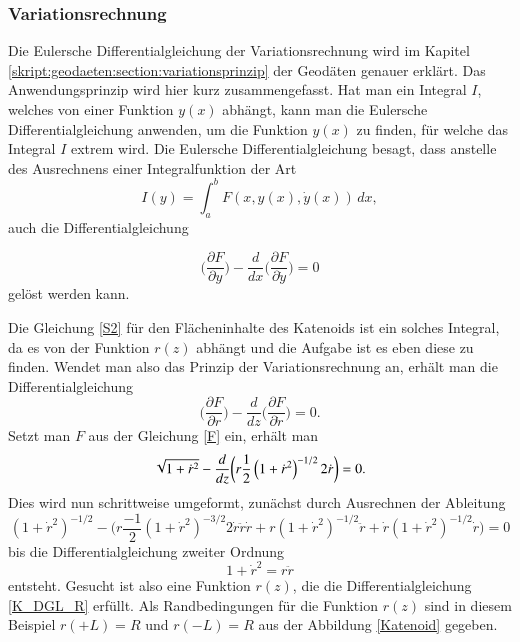 \begin{refsection}
\subsubsection{Variationsrechnung}
Die Eulersche Differentialgleichung der Variationsrechnung wird im Kapitel \ref{skript:geodaeten:section:variationsprinzip}  der Geodäten genauer erklärt.
Das Anwendungsprinzip wird hier kurz zusammengefasst. Hat man ein Integral $I$, welches von einer Funktion $y(x)$ abhängt, kann man die Eulersche Differentialgleichung anwenden, um die Funktion $y(x)$ zu finden, für welche das Integral $I$ extrem wird. Die Eulersche Differentialgleichung besagt, dass anstelle des Ausrechnens  einer Integralfunktion der Art \begin{equation} \label{E_DGL1}  
  I(y)= \int_a^b F(x,y(x),\dot y(x))\,dx ,       
\end{equation}
auch die Differentialgleichung  



\begin{equation} \label{E_DGL2}
\bigg(\frac{\partial F}{\partial y}\bigg)- \frac{d}{dx} \bigg(\frac{\partial F}{\partial \dot{y}}\bigg)=0         
\end{equation}
gelöst werden kann.

Die Gleichung \eqref{S2} für den Flächeninhalte des Katenoids ist ein solches Integral, da es von der Funktion $r(z)$ abhängt und die Aufgabe ist es eben diese zu finden. Wendet man also das Prinzip der Variationsrechnung an, erhält man die Differentialgleichung
\begin{equation} \label{K_DGL1}
\bigg(\frac{\partial F}{\partial r}\bigg)- \frac{d}{dz} \bigg(\frac{\partial F}{\partial \dot{r}}\bigg)=0 .
\end{equation}
Setzt man $F$ aus der Gleichung \eqref{F} ein, erhält man
\begin{equation} \label{K_DGL_H}
\sqrt{1+{\dot {r}}^2}-\frac{ d }{ dz } \bigg( r \frac{ 1 }{2  }\left( {1+{\dot {r}}^2}  \right)^{-1/2} 2 \dot {r}\bigg)=0 .
\\
\end{equation}
Dies wird nun schrittweise umgeformt, zunächst durch Ausrechnen der Ableitung
\begin{equation} \label{K_DGL_H2}
\left(1+{\dot {r}}^2  \right)^{-1/2}-\bigg(r \frac{ -1 }{2  } \left({1+{\dot {r}}^2}  \right)^{-3/2} 2 \dot{r} \ddot{r}  \dot{r}+ r \left({1+{\dot {r}}^2}  \right)^{-1/2} \ddot{r} +\dot{r} \left({1+{\dot {r}}^2}  \right)^{-1/2} \dot{r}\bigg)=0
\end{equation}
bis die Differentialgleichung zweiter Ordnung  
\begin{equation} \label{K_DGL_R}
1+{\dot {r}}^2=r  \ddot{r}
\end{equation}
entsteht. 
Gesucht ist also eine Funktion $r(z)$, die die Differentialgleichung \eqref{K_DGL_R} erfüllt. Als Randbedingungen für die Funktion $r(z)$ sind in diesem Beispiel $r(+L)=R$ und $r(-L)=R$ aus der Abbildung \ref{Katenoid} gegeben.


\end{refsection}
